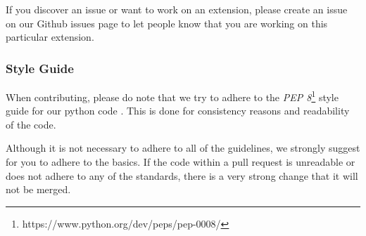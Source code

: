 If you discover an issue or want to work on an extension, please create an issue on our Github issues page to let people know that you are working on this particular extension.

\subsubsection{Style Guide}

When contributing, please do note that we try to adhere to the \textit{PEP 8}\footnote{https://www.python.org/dev/peps/pep-0008/} style guide for our python code \cite{pythonpep8}.
This is done for consistency reasons and readability of the code.

Although it is not necessary to adhere to all of the guidelines, we strongly suggest for you to adhere to the basics.
If the code within a pull request is unreadable or does not adhere to any of the standards, there is a very strong change that it will not be merged.

\endgroup
